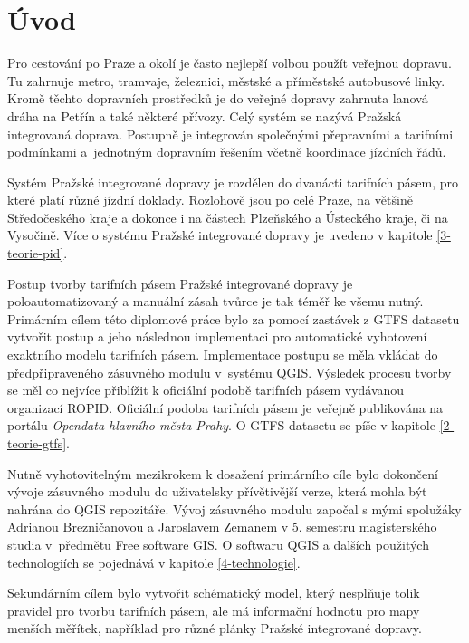 \chapter*{Úvod}
\label{0-uvod}

Pro cestování po Praze a okolí je často nejlepší volbou použít veřejnou dopravu. 
Tu zahrnuje metro, tramvaje, železnici, městské a příměstské autobusové linky.
Kromě těchto dopravních prostředků je do veřejné dopravy zahrnuta lanová dráha na Petřín a také některé přívozy. 
Celý systém se nazývá Pražská integrovaná doprava. Po\-stupně je integrován společnými přepravními
a tarifními podmínkami a~jednotným dopravním řešením včetně koordinace jízdních řádů.

Systém Pražské integrované dopravy je rozdělen do dvanácti tarifních pásem, pro
které platí různé jízdní doklady. Rozlohově jsou po celé Praze, na většině
Středočeského kraje a dokonce i na částech Plzeňského a Ústeckého kraje, či na Vysočině.
Více o systému Pražské integrované dopravy je uvedeno v kapitole \ref{3-teorie-pid}.

Postup tvorby tarifních pásem Pražské integrované dopravy je poloautomatizovaný
a manuální zásah tvůrce je tak téměř ke všemu nutný.
Primárním cílem této diplomové práce bylo za pomocí zastávek z GTFS datasetu vytvořit 
postup a jeho následnou implementaci pro automatické vyhotovení exaktního modelu tarifních pásem.
Implementace postupu se měla vkládat do předpřipraveného zásuvného mo\-dulu v~systému QGIS.
Výsledek procesu tvorby se měl co nejvíce přiblížit k oficiální podobě tarifních pásem
vydávanou organizací ROPID. 
Oficiální podoba tarifních pásem je veřejně publikována na portálu \textit{Opendata hlavního města Prahy}.
O GTFS datasetu se píše v kapitole \ref{2-teorie-gtfs}.

Nutně vyhotovitelným mezikrokem k dosažení primárního cíle bylo dokončení
vývoje zásuvného modulu do uživatelsky přívětivější verze, která mohla být nahrána do QGIS repozitáře.
Vývoj zásuvného modulu započal s mými spolužáky Adrianou Brezničanovou a Jaroslavem
Zemanem v 5. semestru magisterského studia v~předmětu Free software GIS.
O softwaru QGIS a dalších použitých technologiích se pojednává v kapitole \ref{4-technologie}. 

Sekundárním cílem bylo vytvořit schématický model, který nesplňuje tolik
pravi\-del pro tvorbu tarifních pásem, ale má informační hodnotu pro mapy menších měřítek,
například pro různé plánky Pražské integrované dopravy.

